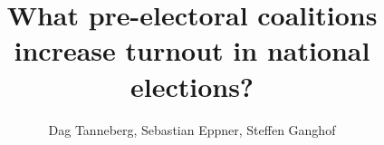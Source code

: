 
\usepackage[utf8]{inputenc}
\usepackage{graphicx}
\usepackage{rotating}
\usepackage{booktabs}
\usepackage{blindtext}

% 

\author{Dag Tanneberg, Sebastian Eppner, Steffen Ganghof}
\title{What pre-electoral coalitions increase turnout in national elections?}
